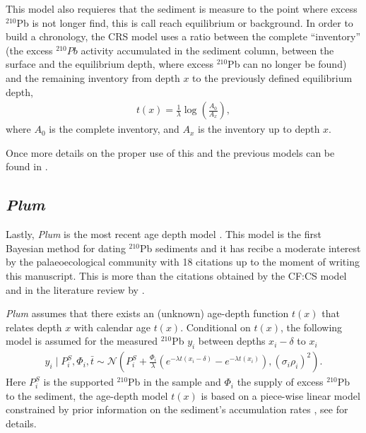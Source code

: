 \documentclass [10pt] {article}
\begin{document}
This model also requieres that the sediment is measure to the point where excess $^{210}$Pb is not longer find, this is call reach equilibrium or background.
In order to build a chronology, the CRS model uses a ratio between the complete ``inventory'' (the excess $^{210}Pb$ activity accumulated in the sediment column, between the surface and the equilibrium depth, where excess $^{210}$Pb  can no longer be found) and the remaining  inventory from depth $x$ to the previously defined equilibrium depth, 
\begin{eqnarray}
	t(x)=\frac{1}{\lambda}\log\left( \frac{A_0}{A_x}\right),
\end{eqnarray}
where $A_0$ is the complete inventory, and $A_x$ is the inventory up to depth $x$.


Once more details on the proper use of this and the previous models can be found in \citet{Sanchez-Cabeza2012}.

\subsection{\textit{Plum}}

Lastly, \textit{Plum} is the most recent age depth model \citep{Aquino2018}.
This model is the first Bayesian method for dating $^{210}$Pb sediments and it has recibe a moderate interest by the palaeoecological community with 18 citations up to the moment of writing this manuscript.
This is more than the citations obtained by the CF:CS model and  in the literature review by \citet{Courtney2019}.

\textit{Plum} assumes that there exists an (unknown) age-depth function $t(x)$ that relates depth $x$ with calendar age $t(x)$. 
Conditional on $t(x)$, the following model is assumed for the measured $^{210}$Pb $y_i$ between depths $x_i - \delta$ to $x_i$
\begin{eqnarray}
y_i\mid P^S_i, \Phi_i, \bar{t}\sim \mathcal{N} \left(P^S_i+\frac{\Phi_i}{\lambda} \left( e^{-\lambda t(x_i-\delta)} - e^{-\lambda t(x_i)} \right), (\sigma_i\rho_i)^2 \right). 
\end{eqnarray}
Here $P_i^S$ is the supported $^{210}$Pb in the sample and $\Phi_i$ the supply of excess $^{210}$Pb to the sediment, the age-depth model $t(x)$ is based on a piece-wise linear model constrained by prior information on the sediment's accumulation rates  \citep{Blaauw2011}, see \citep{Aquino2018} for details.
\end{document}

